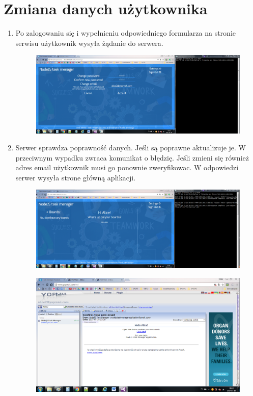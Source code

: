 \documentclass[12pt]{report}
\begin{document}
\section{Zmiana danych użytkownika}
\begin{enumerate}
\item Po zalogowaniu się i wypełnieniu odpowiedniego formularza na stronie serwisu użytkownik wysyła żądanie do serwera.
\begin{figure}[!hb]
\centering
\includegraphics[width=\textwidth,height=\textheight,keepaspectratio]{61.png}
\end{figure}
\item Serwer sprawdza poprawność danych. Jeśli są poprawne aktualizuje je.
W przeciwnym wypadku zwraca komunikat o błędzię. 
Jeśli zmieni się również adres email użytkownik musi go ponownie zweryfikowac. 
W odpowiedzi serwer wysyła strone główną aplikacji.
\begin{figure}[!hb]
\centering
\includegraphics[width=\textwidth,height=\textheight,keepaspectratio]{62.png}
\end{figure}
\begin{figure}[!hb]
\centering
\includegraphics[width=\textwidth,height=\textheight,keepaspectratio]{63.png}
\end{figure}
\end{enumerate}
\end{document}
